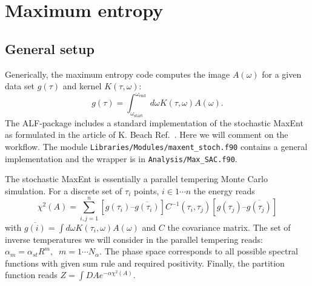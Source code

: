 

\section{Maximum entropy }

\subsection{General setup}
Generically, the maximum entropy code computes the  image  $A(\omega) $ for a given  data  set $g(\tau) $  and kernel $K(\tau,\omega) $:
\begin{equation}
g(\tau) =  \int_{\omega_\text{start}}^{\omega_\text{end}} d {\omega} K(\tau,\omega) A(\omega).
\end{equation} 
The  ALF-package includes a standard implementation of the stochastic MaxEnt as formulated in the article of K. Beach Ref.~\cite{Beach04a}. Here we will comment on the workflow.  The module 
\texttt{Libraries/Modules/\allowbreak{}maxent\_stoch.f90} contains a general implementation and the wrapper is in \texttt{Analysis/Max\_SAC.f90}. 

The stochastic MaxEnt is essentially a parallel tempering Monte Carlo simulation.    For a discrete set of $\tau_i$ points,  $i \in 1 \cdots n $ the energy reads
\begin{equation}
  \chi^{2}(A) =  \sum_{i,j=1}^{n}   \left[ g(\tau_i)  –    \overline{g(\tau_i)} \right] C^{-1}(\tau_i,\tau_j) \left[    g(\tau_j)  –  \overline{g(\tau_j)} \right] 
\end{equation} with $ \overline{g(i)} =\int d{\omega} K(\tau_{i},\omega)  A(\omega)$ and  $C$ the covariance matrix. 
The set  of inverse temperatures  we will consider  in the parallel tempering reads:
$ \alpha_m = \alpha_{st}  R^{m}, \; \; m = 1 \cdots N_{\alpha} $.   The phase space corresponds to all possible spectral functions with given sum rule and required positivity.  Finally,  the partition function reads
$Z =  \int{DA} e^{-\alpha \chi^{2}(A)}$.  

